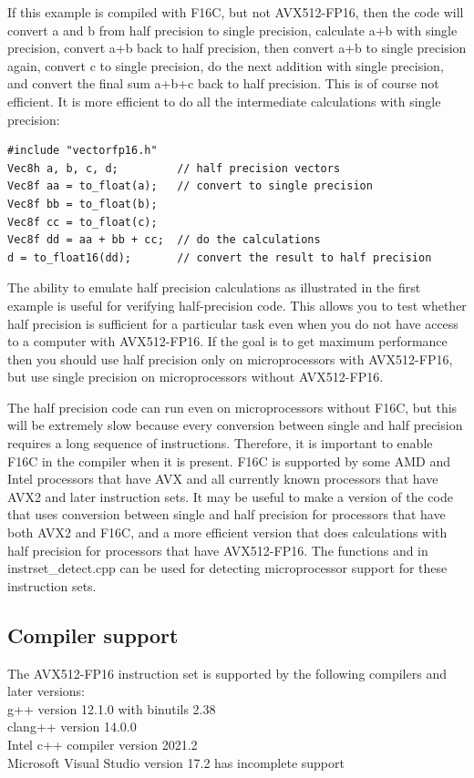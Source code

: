 \documentclass[vcl_manual.tex]{subfiles}
\begin{document}
If this example is compiled with F16C, but not AVX512-FP16, then the code will convert a and b from half precision to single precision, calculate a+b with single precision, convert a+b back to half precision, then convert a+b to single precision again, convert c to single precision, do the next addition with single precision, and convert the final sum a+b+c back to half precision. This is of course not efficient. It is more efficient to do all the intermediate calculations with single precision:

\begin{lstlisting}[frame=single]
#include "vectorfp16.h"
Vec8h a, b, c, d;         // half precision vectors
Vec8f aa = to_float(a);   // convert to single precision
Vec8f bb = to_float(b);
Vec8f cc = to_float(c);
Vec8f dd = aa + bb + cc;  // do the calculations
d = to_float16(dd);       // convert the result to half precision
\end{lstlisting}

The ability to emulate half precision calculations as illustrated in the first example is useful for verifying half-precision code. This allows you to test whether half precision is sufficient for a particular task even when you do not have access to a computer with AVX512-FP16. If the goal is to get maximum performance then you should use half precision only on microprocessors with AVX512-FP16, but use single precision on microprocessors without AVX512-FP16.

The half precision code can run even on microprocessors without F16C, but this will be extremely slow because every conversion between single and half precision requires a long sequence of instructions. Therefore, it is important to enable F16C in the compiler when it is present. F16C is supported by some AMD and Intel processors that have AVX and all currently known processors that have AVX2 and later instruction sets. It may be useful to make a version of the code that uses conversion between single and half precision for processors that have both AVX2 and F16C, and a more efficient version that does calculations with half precision for processors that have AVX512-FP16. The functions  and  in instrset\_detect.cpp can be used for detecting microprocessor support for these instruction sets.

\subsection{Compiler support}
The AVX512-FP16 instruction set is supported by the following compilers and later versions:\\
g++ version 12.1.0 with binutils 2.38 \\
clang++ version 14.0.0 \\
Intel c++ compiler version 2021.2\\
Microsoft Visual Studio version 17.2 has incomplete support
\end{document}
